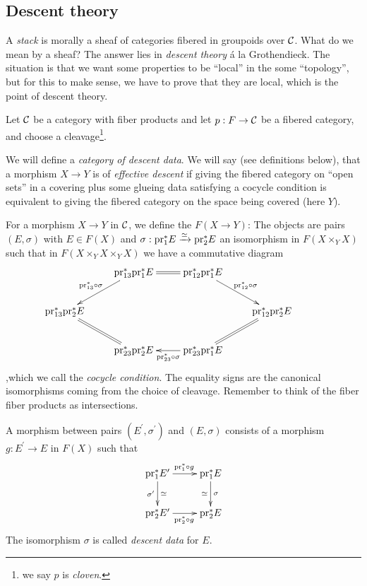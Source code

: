 \documentclass[11pt, english]{article}
\begin{document}
\subsection{Descent theory}

A \emph{stack} is morally a sheaf of categories fibered in groupoids over $\mathcal{C}$. What do we mean by a sheaf? The answer lies in \emph{descent theory} á la Grothendieck. The situation is that we want some properties to be ``local'' in the some ``topology'', but for this to make sense, we have to prove that they are local, which is the point of descent theory.

Let $\mathcal{C}$ be a category with fiber products and let $p:F \to \mathcal{C}$ be a fibered category, and choose a cleavage\footnote{we say $p$ is \emph{cloven}.}.

We will define a \emph{category of descent data}. We will say (see definitions below), that a morphism $X \to Y$ is of \emph{effective descent} if giving the fibered category on ``open sets'' in a covering plus some glueing data satisfying a cocycle condition is equivalent to giving the fibered category on the space being covered (here $Y$).

For a morphism $X \to Y$ in $\mathcal{C}$, we define the  $F(X \to Y)$: The objects are pairs $(E,\sigma)$ with $E \in F(X)$ and $\sigma:\mathrm{pr}_1^\ast E \xrightarrow{\simeq} \mathrm{pr}_2^\ast E$ an isomorphism in $F(X \times_Y X)$ such that in $F(X \times_Y X \times_Y X)$ we have a commutative diagram
\[
\xymatrix{
 & \pr_{13}^\ast \pr_1^\ast E \ar@{=}[r] \ar[dl]_{\pr_{13}^\ast \circ \sigma} & \pr_{12}^\ast \pr_1^\ast E \ar[dr]^{\pr_{12}^\ast \circ \sigma} & \\
\pr_{13}^\ast \pr_2^\ast E \ar@{=}[dr]  & &  & \pr_{12} ^\ast \pr_2 ^ \ast E \ar@{=}[dl]  \\
 & \pr_{23}^\ast \pr_2^\ast E & \ar[l]^{\pr_{23}^\ast \circ \sigma} \pr_{23} ^\ast \pr_1 ^\ast E & & 
} 
\]
,which we call the \emph{cocycle condition}. The equality signs are the canonical isomorphisms coming from the choice of cleavage. Remember to think of the fiber fiber products as intersections.

A morphism between pairs $(E^\prime, \sigma^\prime)$ and $(E,\sigma)$ consists of a morphism $g:E^\prime \to E$ in $F(X)$ such that
\[
\xymatrix{
\pr_1^\ast E^\prime \ar[r]^{\pr_1^\ast \circ g} \ar[d]^{\simeq}_{\sigma^\prime} & \pr_1^\ast E \ar[d]^\sigma_\simeq \\
\pr_2^\ast E^\prime \ar[r]_{\pr_2^\ast \circ g} & \pr_2^\ast E
}
\]
The isomorphism $\sigma$ is called \emph{descent data} for $E$.
\end{document}
